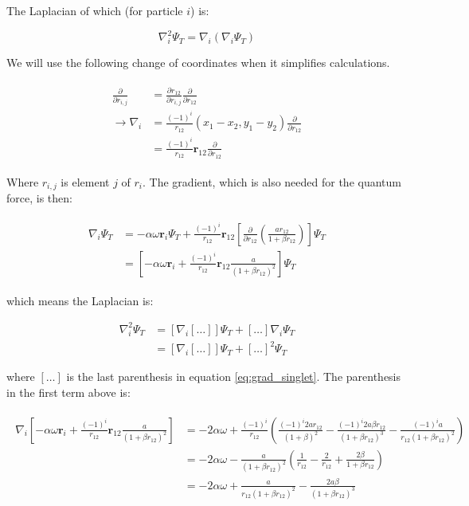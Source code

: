 \documentclass[english, a4paper]{article}
\newcommand{\bm}[1]{\mathbf{#1}}
\begin{document}
The Laplacian of which (for particle $i$) is:

\begin{equation}
	\nabla_i^2 \Psi_T = \nabla_i(\nabla_i\Psi_T)
\end{equation}

We will use the following change of coordinates when it simplifies calculations.

\begin{align}
	\begin{split}
	\frac{\partial}{\partial r_{i,j}} &= \frac{\partial r_{12}}{\partial r_{i,j}}\frac{\partial}{\partial r_{12}}\\
	\rightarrow \nabla_i &= \frac{(-1)^i}{r_{12}}(x_1-x_2, y_1-y_2)\frac{\partial}{\partial r_{12}}\\
	&= \frac{(-1)^i}{r_{12}}\bm{r}_{12}\frac{\partial}{\partial r_{12}}
	\end{split}
	\label{eq:coord_change_nabla}
\end{align}

Where $r_{i,j}$ is element $j$ of $r_i$.
The gradient, which is also needed for the quantum force, is then:

\begin{align}
	\begin{split}
	\nabla_i\Psi_T &= -\alpha\omega\bm{r}_i\Psi_T + \frac{(-1)^i}{r_{12}}\bm{r}_{12}\left[\frac{\partial}{\partial r_{12}}\left(\frac{ar_{12}}{1+\beta r_{12}}\right)\right]\Psi_T\\
	&= \left[-\alpha\omega\bm{r}_i + \frac{(-1)^i}{r_{12}}\bm{r}_{12}\frac{a}{(1+\beta r_{12})^2}\right]\Psi_T
	\end{split}
	\label{eq:grad_singlet}
\end{align} 

which means the Laplacian is:

\begin{equation}
	\begin{split}
	\nabla_i^2\Psi_T &= \left[\nabla_i[\ldots]\right]\Psi_T + [\ldots]\nabla_i\Psi_T\\
	&= \left[\nabla_i[\ldots]\right]\Psi_T + [\ldots]^2\Psi_T
	\end{split}
\end{equation}

where $[\ldots]$ is the last parenthesis in equation \ref{eq:grad_singlet}. The parenthesis in the first term above is:

\begin{align}
	\begin{split}
	\nabla_i\left[-\alpha\omega\bm{r}_i + \frac{(-1)^i}{r_{12}}\bm{r}_{12}\frac{a}{(1+\beta r_{12})^2}\right] &= -2\alpha\omega + \frac{(-1)^i}{r_{12}}\left( \frac{(-1)^i2ar_{12}}{(1+\beta)^2} - \frac{(-1)^i2a\beta r_{12}}{(1+\beta r_{12})^3} - \frac{(-1)^ia}{r_{12}(1+\beta r_{12})^2}\right)\\
	&= -2\alpha\omega - \frac{a}{(1+\beta r_{12})^2}\left( \frac{1}{r_{12}} - \frac{2}{r_{12}} + \frac{2\beta}{1+\beta r_{12}}\right)\\
	&= -2\alpha\omega + \frac{a}{r_{12}(1+\beta r_{12})^2}- \frac{2a\beta}{(1+\beta r_{12})^3}
	\end{split}
\end{align}
\end{document}
